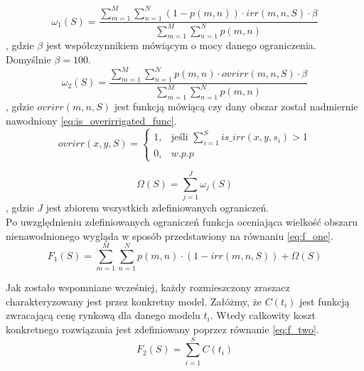 \documentclass[twoside]{iisthesis}
\begin{document}
\begin{equation}\label{eq:constraint_out_of_bounds}
	\omega_{1}(S) = \dfrac{\sum_{m=1}^{M}\sum_{n=1}^{N} (1 - p(m,n)) \cdot irr(m,n,S) \cdot \beta}{\sum_{m=1}^{M}\sum_{n=1}^{N} p(m,n)}
\end{equation}
, gdzie $\beta$ jest współczynnikiem mówiącym o mocy danego ograniczenia. Domyślnie $\beta=100$.\\
\begin{equation}\label{eq:constraint_overrirr}
	\omega_{2}(S) = \dfrac{\sum_{m=1}^{M}\sum_{n=1}^{N} p(m,n) \cdot ovrirr(m,n,S) \cdot \beta}{\sum_{m=1}^{M}\sum_{n=1}^{N} p(m,n)}
\end{equation}
, gdzie $ovrirr(m,n,S)$ jest funkcją mówiącą czy dany obszar został nadmiernie nawodniony \eqref{eq:is_overirrigated_func}.\\
\begin{equation}\label{eq:is_overirrigated_func}
	ovrirr(x,y,S) = \begin{cases}
				1,& \text{jeśli } \sum_{i=1}^{S} is\_irr(x,y,s_{i}) > 1 \\
				0,& w.p.p
			   \end{cases}
\end{equation}

\begin{equation}\label{eq:constraint_sum}
	\Omega(S) = \sum_{j = 1}^{J} \omega_{j}(S)
\end{equation}
, gdzie $J$ jest zbiorem wszystkich zdefiniowanych ograniczeń.\\

Po uwzględnieniu zdefiniowanych ograniczeń funkcja oceniająca wielkość obszaru nienawodnionego wygląda w sposób przedstawiony na równaniu \eqref{eq:f_one}.
\begin{equation}\label{eq:f_one}
F_{1}(S) = \sum_{m=1}^{M}\sum_{n=1}^{N} p(m,n) \cdot (1 - irr(m,n,S)) + \Omega(S)
\end{equation}

Jak zostało wspomniane wcześniej, każdy rozmieszczony zraszacz charakteryzowany jest przez konkretny model. Załóżmy, że $C(t_{i})$ jest funkcją zwracającą cenę rynkową dla danego modelu $t_i$. Wtedy całkowity koszt konkretnego rozwiązania jest zdefiniowany poprzez równanie \eqref{eq:f_two}.
\begin{equation}\label{eq:f_two}
	F_{2}(S) = \sum_{i=1}^{S} C(t_{i})
\end{equation}\\
\end{document}
